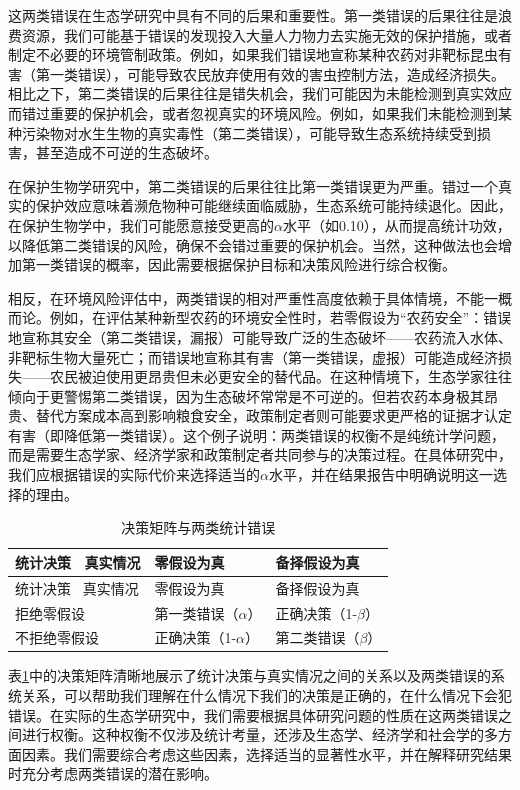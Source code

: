 \documentclass[
  twoside,12pt,fontset=none]{ctexbook}
\begin{document}
这两类错误在生态学研究中具有不同的后果和重要性。第一类错误的后果往往是浪费资源，我们可能基于错误的发现投入大量人力物力去实施无效的保护措施，或者制定不必要的环境管制政策。例如，如果我们错误地宣称某种农药对非靶标昆虫有害（第一类错误），可能导致农民放弃使用有效的害虫控制方法，造成经济损失。相比之下，第二类错误的后果往往是错失机会，我们可能因为未能检测到真实效应而错过重要的保护机会，或者忽视真实的环境风险。例如，如果我们未能检测到某种污染物对水生生物的真实毒性（第二类错误），可能导致生态系统持续受到损害，甚至造成不可逆的生态破坏。

在保护生物学研究中，第二类错误的后果往往比第一类错误更为严重。错过一个真实的保护效应意味着濒危物种可能继续面临威胁，生态系统可能持续退化。因此，在保护生物学中，我们可能愿意接受更高的\(\alpha\)水平（如0.10），从而提高统计功效，以降低第二类错误的风险，确保不会错过重要的保护机会。当然，这种做法也会增加第一类错误的概率，因此需要根据保护目标和决策风险进行综合权衡。

相反，在环境风险评估中，两类错误的相对严重性高度依赖于具体情境，不能一概而论。例如，在评估某种新型农药的环境安全性时，若零假设为``农药安全''：错误地宣称其安全（第二类错误，漏报）可能导致广泛的生态破坏------农药流入水体、非靶标生物大量死亡；而错误地宣称其有害（第一类错误，虚报）可能造成经济损失------农民被迫使用更昂贵但未必更安全的替代品。在这种情境下，生态学家往往倾向于更警惕第二类错误，因为生态破坏常常是不可逆的。但若农药本身极其昂贵、替代方案成本高到影响粮食安全，政策制定者则可能要求更严格的证据才认定有害（即降低第一类错误）。这个例子说明：两类错误的权衡不是纯统计学问题，而是需要生态学家、经济学家和政策制定者共同参与的决策过程。在具体研究中，我们应根据错误的实际代价来选择适当的\(\alpha\)水平，并在结果报告中明确说明这一选择的理由。

\begin{longtable}[]{@{}lll@{}}
\caption{\label{tab:decision-matrix} 决策矩阵与两类统计错误}\tabularnewline
\toprule\noalign{}
统计决策 ~真实情况 & 零假设为真 & 备择假设为真 \\
\midrule\noalign{}
\endfirsthead
\toprule\noalign{}
统计决策 ~真实情况 & 零假设为真 & 备择假设为真 \\
\midrule\noalign{}
\endhead
\bottomrule\noalign{}
\endlastfoot
拒绝零假设 & 第一类错误（\(\alpha\)） & 正确决策（1-\(\beta\)） \\
不拒绝零假设 & 正确决策（1-\(\alpha\)） & 第二类错误（\(\beta\)） \\
\end{longtable}

表\ref{tab:decision-matrix}中的决策矩阵清晰地展示了统计决策与真实情况之间的关系以及两类错误的系统关系，可以帮助我们理解在什么情况下我们的决策是正确的，在什么情况下会犯错误。在实际的生态学研究中，我们需要根据具体研究问题的性质在这两类错误之间进行权衡。这种权衡不仅涉及统计考量，还涉及生态学、经济学和社会学的多方面因素。我们需要综合考虑这些因素，选择适当的显著性水平，并在解释研究结果时充分考虑两类错误的潜在影响。
\end{document}
